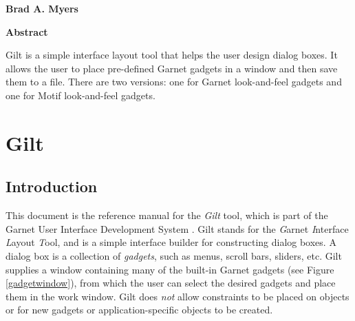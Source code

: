 


\begin{titlepage}
\begin{titlebox}
\vspace{0.6 inch}


{\bf Brad A. Myers}
\vspace{0.3 line}
\value{date}
\end{titlebox}
\vspace{0.5 inch}
\begin{center}
{\bf Abstract}\end{center}
\begin{text}
Gilt is a simple interface layout tool that helps the user design dialog
boxes.  It allows the user to place pre-defined Garnet gadgets in a window
and then save them to a file.  There are two versions: one for Garnet
look-and-feel gadgets and one for Motif look-and-feel gadgets.
\vspace{0.5 inch}

\end{text}
\end{titlepage}





\chapter{Gilt}

\section{Introduction}

This document is the reference manual for the {\it Gilt} tool, which
is part of the Garnet User Interface Development System \cite{GarnetIEEE}.
Gilt stands for the {\it G}arnet {\it I}nterface {\it L}ayout {\it T}ool, and is
a simple interface builder for constructing dialog boxes.  A dialog box is
a collection of {\it gadgets}, such as menus, scroll bars, sliders, etc.
Gilt supplies a window containing many of the built-in Garnet gadgets (see
Figure \ref{gadgetwindow}), from
which the user can select the desired gadgets and place them in the work
window.  Gilt does {\it not} allow constraints to be placed on objects or for
new gadgets or application-specific objects to be created.

